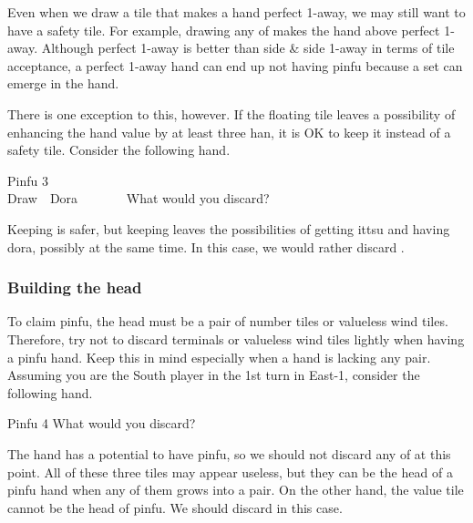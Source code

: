 \bigskip
Even when we draw a tile that makes a hand perfect 1-away, we may still want to have a safety tile. For example, drawing any of {\LARGE{}} makes the hand above perfect 1-away. 
Although perfect 1-away is better than side \& side 1-away in terms of tile acceptance, a perfect 1-away hand can end up not having {\jap pinfu} because a set can emerge in the hand. 

\vfill
There is one exception to this, however. If the floating tile leaves a possibility of enhancing the hand value by at least three {\jap han}, it is OK to keep it instead of a safety tile. Consider the following hand. 
\begin{itembox}[r]{{\jap Pinfu} 3}
\bp
{}~\xi~\\
\hfill\footnotesize{Draw~~{\jap Dora}~~~~~~~}
\ep
\vspace{-17pt}What would you discard? \vspace{-5pt}
\end{itembox}

\bigskip
\noindent Keeping {\LARGE\xi} is safer, but keeping {\LARGE{}} leaves the possibilities of getting {\jap ittsu} and having {\jap dora}, possibly at the same time. In this case, we would rather discard {\LARGE\xi}. 

\newpage

\subsubsection{Building the head}
To claim {\jap pinfu}, the head must be a pair of number tiles or valueless wind tiles. Therefore, try not to discard terminals or valueless wind tiles lightly when having a {\jap pinfu} hand. Keep this in mind especially when a hand is lacking any pair. Assuming you are the South player in the 1st turn in East-1, consider the following hand. 
\begin{itembox}[r]{{\jap Pinfu} 4}
\bp
{}\xi\fa
\ep
\vspace{-10pt}What would you discard? \vspace{-5pt}
\end{itembox}

\bigskip
\noindent The hand has a potential to have {\jap pinfu}, so we should not discard any of {\LARGE{}\xi} at this point. All of these three tiles may appear useless, but they can be the head of a {\jap pinfu} hand when any of them grows into a pair. On the other hand, the value tile {\LARGE\fa} cannot be the head of {\jap pinfu}. We should discard {\LARGE\fa} in this case. 

